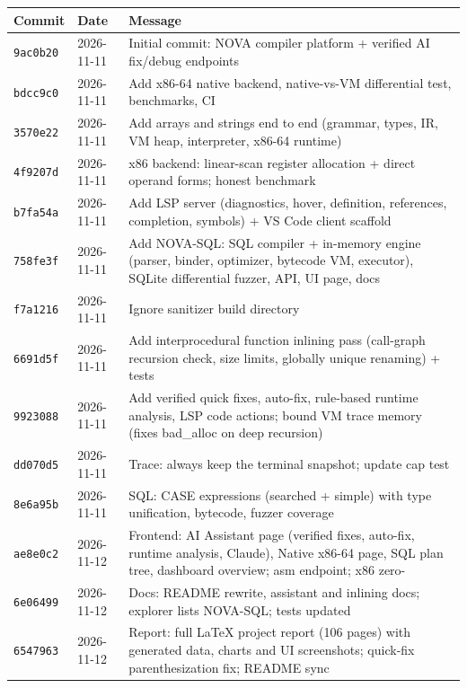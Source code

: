 \begin{longtable}{@{}lll@{}}\toprule
\textbf{Commit} & \textbf{Date} & \textbf{Message}\\ \midrule\endhead
\texttt{9ac0b20} & 2026-11-11 & \parbox[t]{0.68\textwidth}{Initial commit: NOVA compiler platform + verified AI fix/debug endpoints}\\
\texttt{bdcc9c0} & 2026-11-11 & \parbox[t]{0.68\textwidth}{Add x86-64 native backend, native-vs-VM differential test, benchmarks, CI}\\
\texttt{3570e22} & 2026-11-11 & \parbox[t]{0.68\textwidth}{Add arrays and strings end to end (grammar, types, IR, VM heap, interpreter, x86-64 runtime)}\\
\texttt{4f9207d} & 2026-11-11 & \parbox[t]{0.68\textwidth}{x86 backend: linear-scan register allocation + direct operand forms; honest benchmark}\\
\texttt{b7fa54a} & 2026-11-11 & \parbox[t]{0.68\textwidth}{Add LSP server (diagnostics, hover, definition, references, completion, symbols) + VS Code client scaffold}\\
\texttt{758fe3f} & 2026-11-11 & \parbox[t]{0.68\textwidth}{Add NOVA-SQL: SQL compiler + in-memory engine (parser, binder, optimizer, bytecode VM, executor), SQLite differential fuzzer, API, UI page, docs}\\
\texttt{f7a1216} & 2026-11-11 & \parbox[t]{0.68\textwidth}{Ignore sanitizer build directory}\\
\texttt{6691d5f} & 2026-11-11 & \parbox[t]{0.68\textwidth}{Add interprocedural function inlining pass (call-graph recursion check, size limits, globally unique renaming) + tests}\\
\texttt{9923088} & 2026-11-11 & \parbox[t]{0.68\textwidth}{Add verified quick fixes, auto-fix, rule-based runtime analysis, LSP code actions; bound VM trace memory (fixes bad\_alloc on deep recursion)}\\
\texttt{dd070d5} & 2026-11-11 & \parbox[t]{0.68\textwidth}{Trace: always keep the terminal snapshot; update cap test}\\
\texttt{8e6a95b} & 2026-11-11 & \parbox[t]{0.68\textwidth}{SQL: CASE expressions (searched + simple) with type unification, bytecode, fuzzer coverage}\\
\texttt{ae8e0c2} & 2026-11-12 & \parbox[t]{0.68\textwidth}{Frontend: AI Assistant page (verified fixes, auto-fix, runtime analysis, Claude), Native x86-64 page, SQL plan tree, dashboard overview; asm endpoint; x86 zero-}\\
\texttt{6e06499} & 2026-11-12 & \parbox[t]{0.68\textwidth}{Docs: README rewrite, assistant and inlining docs; explorer lists NOVA-SQL; tests updated}\\
\texttt{6547963} & 2026-11-12 & \parbox[t]{0.68\textwidth}{Report: full LaTeX project report (106 pages) with generated data, charts and UI screenshots; quick-fix parenthesization fix; README sync}\\
\bottomrule
\end{longtable}
